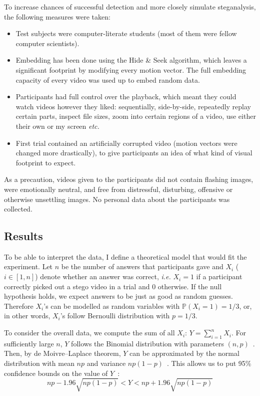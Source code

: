 \documentclass[12pt,british,twoside,notitlepage,usenames,dvipsnames,hypens,final]{report}
\numberwithin{equation}{section}
\numberwithin{figure}{section}
\begin{document}
To increase chances of successful detection and more closely simulate steganalysis, the following measures were taken:
\begin{itemize}
\item Test subjects were computer-literate students (most of them were fellow computer scientists).
\item Embedding has been done using the Hide \& Seek algorithm, which leaves a significant footprint by modifying every motion vector. The full embedding capacity of every video was used up to embed random data.  
\item Participants had full control over the playback, which meant they could watch videos however they liked: sequentially, side-by-side, repeatedly replay certain parts, inspect file sizes, zoom into certain regions of a video, use either their own or my screen \emph{etc.}
\item First trial contained an artificially corrupted video (motion vectors were changed more drastically), to give participants an idea of what kind of visual footprint to expect. 
\end{itemize} 

As a precaution, videos given to the participants did not contain flashing images, were emotionally neutral, and free from distressful, disturbing, offensive or otherwise unsettling images. No personal data about the participants was collected.

\subsection{Results}

To be able to interpret the data, I define a theoretical model that would fit the experiment. Let $n$ be the number of answers that participants gave and $X_i$ ($i \in [1, n]$) denote whether an answer was correct, \emph{i.e.} $X_i = 1$ if a participant correctly picked out a stego video in a trial and 0 otherwise. If the null hypothesis holds, we expect answers to be just as good as random guesses. Therefore $X_i$'s can be modelled as random variables with $\mathbb{P}(X_i = 1) = 1/3$, or, in other words, $X_i$'s follow Bernoulli distribution with $p = 1/3$. 

To consider the overall data, we compute the sum of all $X_i$: $Y = \sum^n_{i=1} X_i$. For sufficiently large $n$, $Y$ follows the Binomial distribution with parameters $(n, p)$~\cite[p.~53]{papoulis2002probability}. Then, by de Moivre--Laplace theorem, $Y$ can be approximated by the normal distribution with mean $np$ and variance $np(1-p)$~\cite[p.~105]{papoulis2002probability}. This allows us to put 95\% confidence bounds on the value of $Y$~\cite[p.~316--318]{ai2-notes}:
\[ np - 1.96 \sqrt{np(1-p)}  < Y <  np + 1.96 \sqrt{np(1-p)} \]
\end{document}
